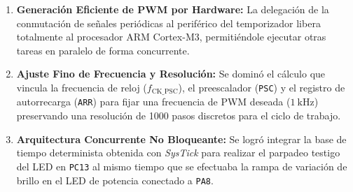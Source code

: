 \begin{enumerate}
    \item \textbf{Generación Eficiente de PWM por Hardware:} La delegación de la conmutación de señales periódicas al
    periférico del temporizador libera totalmente al procesador ARM Cortex-M3, permitiéndole ejecutar otras tareas en
    paralelo de forma concurrente.
    \item \textbf{Ajuste Fino de Frecuencia y Resolución:} Se dominó el cálculo que vincula la frecuencia de reloj
    ($f_{\mathrm{CK\_PSC}}$), el preescalador (\texttt{PSC}) y el registro de autorrecarga (\texttt{ARR}) para fijar una
    frecuencia de PWM deseada ($\qty{1}{\kHz}$) preservando una resolución de 1000 pasos discretos para el ciclo de trabajo.
    \item \textbf{Arquitectura Concurrente No Bloqueante:} Se logró integrar la base de tiempo determinista obtenida con
    \textit{SysTick} para realizar el parpadeo testigo del LED en \texttt{PC13} al mismo tiempo que se efectuaba la rampa
    de variación de brillo en el LED de potencia conectado a \texttt{PA8}.
\end{enumerate}
